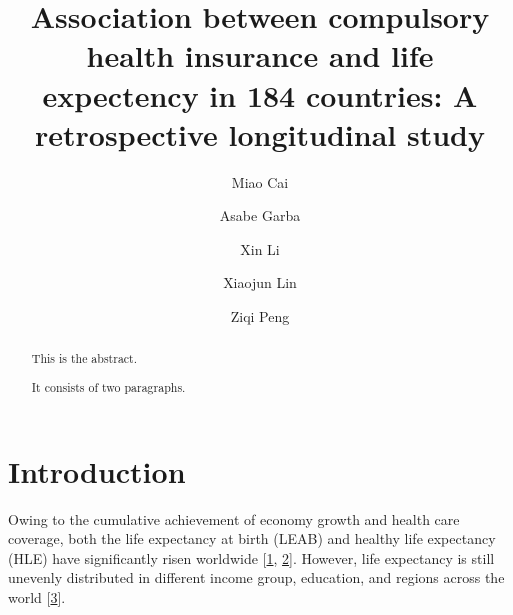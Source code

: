 \documentclass[]{elsarticle} %
\begin{document}
\begin{frontmatter}

  \title{Association between compulsory health insurance and life expectency in 184 countries: A retrospective longitudinal study}
    \author[SLU]{Miao Cai}
  
    \author[SLU]{Asabe Garba}
  
    \author[WHU]{Xin Li}
  
    \author[SCU]{Xiaojun Lin}
    \author[SLU]{Ziqi Peng}
  
      \address[SLU]{College for Public Health and Social Justice, Saint Louis University, Saint Louis, MO, 63108}
    \address[SCU]{West China School of Public Health, Sichuan University, Chengdu, Sichuan, China, 610044}
    \address[WHU]{School of Information Management, Wuhan University, Wuhan, Hubei, China, 430072}
  
  \begin{abstract}
  This is the abstract.
  
  It consists of two paragraphs.
  \end{abstract}
  
 \end{frontmatter}

\newcommand{\blandscape}{\begin{landscape}}
\newcommand{\elandscape}{\end{landscape}}
\doublespacing

\hypertarget{introduction}{%
\section{Introduction}\label{introduction}}

Owing to the cumulative achievement of economy growth and health care coverage, both the life expectancy at birth (LEAB) and healthy life expectancy (HLE) have significantly risen worldwide {[}\protect\hyperlink{ref-bor2013increases}{1}, \protect\hyperlink{ref-mathers2015causes}{2}{]}.
However, life expectancy is still unevenly distributed in different income group, education, and regions across the world {[}\protect\hyperlink{ref-world2018global}{3}{]}.
\end{document}
